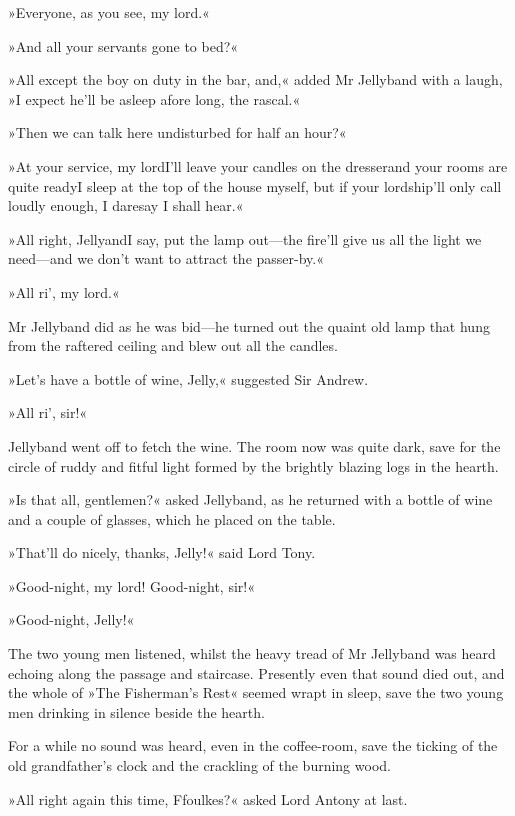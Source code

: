 »Everyone, as you see, my lord.«

»And all your servants gone to bed?«

»All except the boy on duty in the bar, and,« added Mr Jellyband with a laugh, »I expect he'll be asleep afore long, the rascal.«

»Then we can talk here undisturbed for half an hour?«

»At your service, my lord\textellipsis \allowbreak  I'll leave your candles on the dresser\textellipsis \allowbreak  \allowbreak and your rooms are quite ready\textellipsis \allowbreak  I sleep at the top of the house myself, but if your lordship'll only call loudly enough, I daresay I shall hear.«

»All right, Jelly\textellipsis \allowbreak  and\textellipsis \allowbreak  I say, put the lamp out—the fire'll give us all the light we need—and we don't want to attract the passer-by.«

»All ri', my lord.«

Mr Jellyband did as he was bid—he turned out the quaint old lamp that hung from the raftered ceiling and blew out all the candles.

»Let's have a bottle of wine, Jelly,« suggested Sir Andrew.

»All ri', sir!«

Jellyband went off to fetch the wine. The room now was quite dark, save for the circle of ruddy and fitful light formed by the brightly blazing logs in the hearth.

»Is that all, gentlemen?« asked Jellyband, as he returned with a bottle of wine and a couple of glasses, which he placed on the table.

»That'll do nicely, thanks, Jelly!« said Lord Tony.

»Good-night, my lord! Good-night, sir!«

»Good-night, Jelly!«

The two young men listened, whilst the heavy tread of Mr Jellyband was heard echoing along the passage and staircase. Presently even that sound died out, and the whole of »The Fisherman's Rest« seemed wrapt in sleep, save the two young men drinking in silence beside the hearth.

For a while no sound was heard, even in the coffee-room, save the ticking of the old grandfather's clock and the crackling of the burning wood.

»All right again this time, Ffoulkes?« asked Lord Antony at last.

